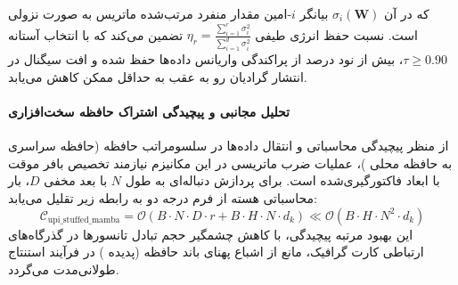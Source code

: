 که در آن $\sigma_i(\mathbf{W})$ بیانگر $i$-امین مقدار منفرد مرتب‌شده ماتریس به صورت نزولی است. نسبت حفظ انرژی طیفی $\eta_r = \frac{\sum_{i=1}^r \sigma_i^2}{\sum_{i=1}^{d} \sigma_i^2}$ تضمین می‌کند که با انتخاب آستانه $\tau \ge 0.90$، بیش از نود درصد از پراکندگی واریانس داده‌ها حفظ شده و افت سیگنال در انتشار گرادیان رو به عقب به حداقل ممکن کاهش می‌یابد.

\paragraph{تحلیل مجانبی و پیچیدگی اشتراک حافظه سخت‌افزاری}
از منظر پیچیدگی محاسباتی و انتقال داده‌ها در سلسومراتب حافظه (حافظه سراسری  به حافظه محلی )، عملیات ضرب ماتریسی در این مکانیزم نیازمند تخصیص بافر موقت با ابعاد فاکتورگیری‌شده است. برای پردازش دنباله‌ای به طول $N$ با بعد مخفی $D$، بار محاسباتی هسته از فرم درجه دو به رابطه زیر تقلیل می‌یابد:
\begin{equation}
\label{eq:complexity_upi_stuffed_mamba}
\mathcal{C}_{\text{upi\_stuffed\_mamba}} = \mathcal{O}\left( B \cdot N \cdot D \cdot r + B \cdot H \cdot N \cdot d_k \right) \ll \mathcal{O}\left( B \cdot H \cdot N^2 \cdot d_k \right)
\end{equation}
این بهبود مرتبه پیچیدگی، با کاهش چشمگیر حجم تبادل تانسورها در گذرگاه‌های ارتباطی کارت گرافیک، مانع از اشباع پهنای باند حافظه (پدیده ) در فرآیند استنتاج طولانی‌مدت می‌گردد.

